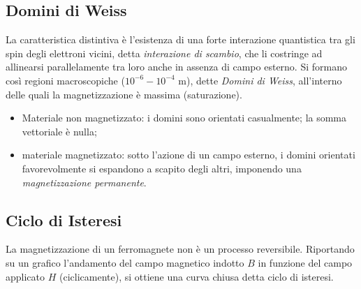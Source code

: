 \documentclass[a4paper,11pt]{report}
\begin{document}
\subsection{Domini di Weiss}
La caratteristica distintiva è l'esistenza di una forte interazione quantistica tra gli spin degli elettroni vicini, detta \textit{interazione di scambio}, che li costringe ad allinearsi parallelamente tra loro anche in assenza di campo esterno.
Si formano così regioni macroscopiche ($10^{-6}-10^{-4}$ m), dette \textit{Domini di Weiss}, all'interno delle quali la magnetizzazione è massima (saturazione).

\begin{itemize}
    \item {Materiale non magnetizzato:} i domini sono orientati casualmente; la somma vettoriale è nulla;
    \item {materiale magnetizzato:} sotto l'azione di un campo esterno, i domini orientati favorevolmente si espandono a scapito degli altri, imponendo una \textit{magnetizzazione permanente}.
\end{itemize}

\subsection{Ciclo di Isteresi}
La magnetizzazione di un ferromagnete non è un processo reversibile. Riportando su un grafico l'andamento del campo magnetico indotto $B$ in funzione del campo applicato $H$ (ciclicamente), si ottiene una curva chiusa detta ciclo di isteresi.
\end{document}
